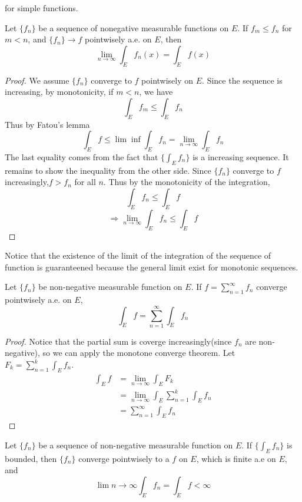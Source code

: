 \documentclass[lang=en, 12pt]{elegantbook}
\begin{document}
        for simple functions. 
        \begin{theorem}
            Let $\{f_n\}$ be a sequence of nonegative measurable functions on $E$. If $f_m \leq f_n$ for $m<n$, and $\{f_n\} \to f$ pointwisely a.e. on
        $E$, then 
        $$\lim_{n \to \infty} \int_E f_n(x) = \int_E f(x) $$
        \end{theorem}
        \begin{proof}
            We assume $\{f_n\}$ converge to $f$ pointwisely on $E$. Since the sequence is increasing, by monotonicity, if $m<n$, we have
            $$\int_E f_m \leq \int_E f_n$$
            Thus by Fatou's lemma 
            $$\int_E f \leq \lim \inf \int_E f_n = \lim_{n\to \infty}\int_E f_n$$
        The last equality comes from the fact that $\{\int_E f_n\}$ is a increasing sequence. It remains to show the inequality from the other
        side. Since $\{f_n\}$ converge to $f$ increasingly,$f> f_n$ for all $n$. Thus by the monotonicity of the integration,
            $$\int_E f_n \leq \int_E f$$
            $$\Rightarrow \lim_{n \to \infty} \int_E f_n \leq \int_E f$$
        \end{proof}
        Notice that the existence of the limit of the integration of the sequence of function is guaranteened because the general limit exist 
        for monotonic sequences.
        \begin{corollary}
            Let $\{f_n\}$ be non-negative measurable function on $E$. If $f = \sum_{n=1}^{\infty} f_n$ converge pointwisely a.e. on $E$,
            $$\int_E f = \sum_{n=1}^{\infty} \int_E f_n$$
        \end{corollary}
        \begin{proof}
            Notice that the partial sum is coverge increasingly(since $f_n$ are non-negative), so we can apply the monotone converge theorem.
        Let $F_k = \sum_{n=1}^{k} \int_E f_n$.
            \begin{equation*}
                \begin{aligned}
                    \int_E f &= \lim_{n \to \infty} \int_E F_k\\
                    &= \lim_{n \to \infty} \int_E \sum_{n=1}^{k} \int_E f_n\\
                    &= \sum_{n=1}^{\infty} \int_E f_n
                \end{aligned}
            \end{equation*}
        \end{proof}
        \begin{lemma}
            Let $\{f_n\}$ be a sequence of non-negative measurable function on $E$. If $\{\int_E f_n\}$ is bounded, then $\{f_n\}$ converge 
        pointwisely to a $f$ on $E$, which is finite a.e on $E$, and 
        $$\lim{n \to \infty} \int_E f_n = \int_E f < \infty$$ 
        \end{lemma}
\end{document}
